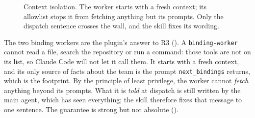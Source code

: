 \documentclass[10pt,a4paper]{article}
\newcommand{\tool}{\textsc{AgentHOT}}
\newcommand{\cc}{Claude Code}
\newcommand{\code}[1]{\texttt{#1}}
\newcommand{\file}[1]{\texttt{#1}}
\newcommand{\mcptool}[1]{\texttt{#1}}
\begin{document}
\begin{figure}[!htb]
\centering
{}
\caption{Context isolation. The worker starts with a fresh context; its
allowlist stops it from fetching anything but its prompts. Only the dispatch
sentence crosses the wall, and the skill fixes its wording.}
\label{fig:context}
\end{figure}

The two binding workers are the plugin's answer to R3
(). A \code{binding-worker} cannot read a file, search the
repository or run a command: those tools are not on its list, so \cc{} will
not let it call them. It starts with a fresh context, and its only source of
facts about the team is the prompt \mcptool{next\_bindings} returns, which is
the footprint. By the principle of least privilege, the worker cannot
\emph{fetch} anything beyond its prompts. What it is \emph{told} at dispatch
is still written by the main agent, which has seen everything; the skill
therefore fixes that message to one sentence. The guarantee is strong but not
absolute ().
\end{document}
